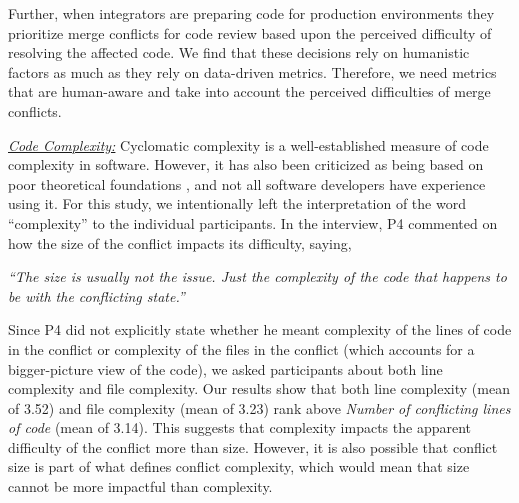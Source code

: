 Further, when integrators are preparing code for production environments they prioritize merge conflicts for code review based upon the perceived difficulty of resolving the affected code.
We find that these decisions rely on humanistic factors as much as they rely on data-driven metrics.
Therefore, we need metrics that are human-aware and take into account the perceived difficulties of merge conflicts.


\underline{\textit{Code Complexity:}} Cyclomatic complexity \cite{mccabe1976complexity} is a well-established measure of code complexity in software. However, it has also been criticized as being based on poor theoretical foundations \cite{Shepperd1988}, and not all software developers have experience using it. For this study, we intentionally left the interpretation of the word ``complexity'' to the individual participants.
In the interview, P4 commented on how the size of the conflict impacts its difficulty, saying,

\begin{displayquote}
\textit{``The size is usually not the issue. Just the complexity of the code that happens to be with the conflicting state.''}	
\end{displayquote}

Since P4 did not explicitly state whether he meant complexity of the lines of code in the conflict or complexity of the files in the conflict (which accounts for a bigger-picture view of the code), we asked participants about both line complexity and file complexity. Our results show that both line complexity (mean of 3.52) and file complexity (mean of 3.23) rank above \textit{Number of conflicting lines of code} (mean of 3.14). This suggests that complexity impacts the apparent difficulty of the conflict more than size. However, it is also possible that conflict size is part of what defines conflict complexity, which would mean that size cannot be more impactful than complexity. 

